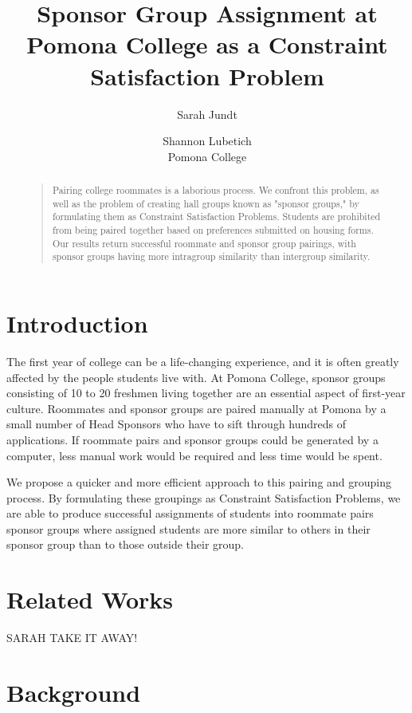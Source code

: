 \documentclass[letterpaper]{article}
\title{Sponsor Group Assignment at Pomona College as a Constraint Satisfaction Problem}
\author{Sarah Jundt \and Shannon Lubetich\\
Pomona College\\}
\begin{document}
\maketitle

\begin{abstract}
\begin{quote}
Pairing college roommates is a laborious process. We confront this problem, as well as the problem of  creating hall groups known as "sponsor groups," by formulating them as Constraint Satisfaction Problems. Students are prohibited from being paired together based on preferences submitted on housing forms. Our results return successful roommate and sponsor group pairings, with sponsor groups having more intragroup similarity than intergroup similarity. 
\end{quote}
\end{abstract}

\section{Introduction}

The first year of college can be a life-changing experience, and it is often greatly affected by the people students live with. At Pomona College, sponsor groups consisting of 10 to 20 freshmen living together are an essential aspect of first-year culture. Roommates and sponsor groups are paired manually at Pomona by a small number of Head Sponsors who have to sift through hundreds of applications. If roommate pairs and sponsor groups could be generated by a computer, less manual work would be required and less time would be spent.

We propose a quicker and more efficient approach to this pairing and grouping process. By formulating these groupings as Constraint Satisfaction Problems, we are able to produce successful assignments of students into roommate pairs sponsor groups where assigned students are more similar to others in their sponsor group than to those outside their group.


\section{Related Works}

SARAH TAKE IT AWAY!

\section{Background}
\end{document}
